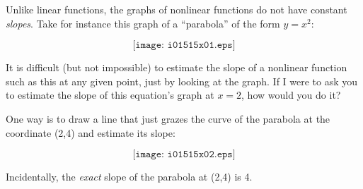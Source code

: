 

Unlike linear functions, the graphs of nonlinear functions do not have constant {\it slopes}.  Take for instance this graph of a ``parabola'' of the form $y = x^2$:

$$\texttt{[image: i01515x01.eps]}$$

It is difficult (but not impossible) to estimate the slope of a nonlinear function such as this at any given point, just by looking at the graph.  If I were to ask you to estimate the slope of this equation's graph at $x=2$, how would you do it?







One way is to draw a line that just grazes the curve of the parabola at the coordinate (2,4) and estimate its slope:

$$\texttt{[image: i01515x02.eps]}$$







Incidentally, the {\it exact} slope of the parabola at (2,4) is 4.




